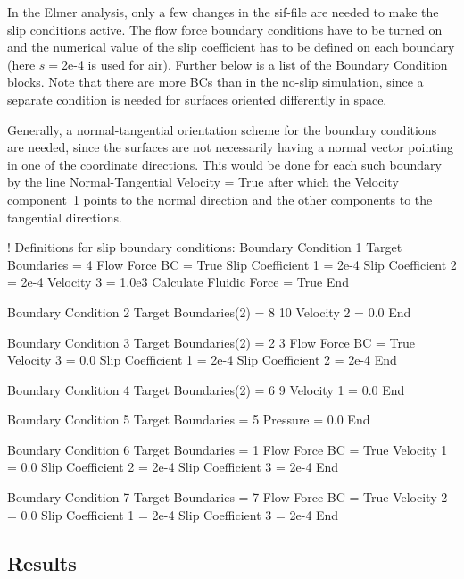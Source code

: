 In the Elmer analysis, only a few changes in the sif-file are needed
to make the slip conditions active. The flow force boundary conditions
have to be turned on and the numerical value of the slip coefficient
has to be defined on each boundary (here $s=$2e-4 is used for
air). Further below is a list of the Boundary Condition blocks. Note
that there are more BCs than in the no-slip simulation, since a
separate condition is needed for surfaces oriented differently in
space.

Generally, a normal-tangential orientation scheme for the boundary
conditions are needed, since the surfaces are not necessarily having a
normal vector pointing in one of the coordinate directions. This would
be done for each such boundary by the line
\ttbegin
  Normal-Tangential Velocity = True
\ttend
after which the Velocity component~1 points to the normal direction
and the other components to the tangential directions.

\ttbegin
! Definitions for slip boundary conditions:
Boundary Condition 1
  Target Boundaries = 4
   Flow Force BC = True
   Slip Coefficient 1 = 2e-4
   Slip Coefficient 2 = 2e-4
   Velocity 3 = 1.0e3
   Calculate Fluidic Force = True
End

Boundary Condition 2
  Target Boundaries(2) = 8 10
   Velocity 2 = 0.0
End

Boundary Condition 3
  Target Boundaries(2) = 2 3
   Flow Force BC = True
   Velocity 3 = 0.0
   Slip Coefficient 1 = 2e-4
   Slip Coefficient 2 = 2e-4
End

Boundary Condition 4
  Target Boundaries(2) = 6 9
   Velocity 1 = 0.0
End

Boundary Condition 5
  Target Boundaries = 5
  Pressure = 0.0
End

Boundary Condition 6
  Target Boundaries = 1
   Flow Force BC = True
   Velocity 1 = 0.0
   Slip Coefficient 2 = 2e-4
   Slip Coefficient 3 = 2e-4
End

Boundary Condition 7
  Target Boundaries = 7
   Flow Force BC = True
   Velocity 2 = 0.0
   Slip Coefficient 1 = 2e-4
   Slip Coefficient 3 = 2e-4
End
\ttend

\subsection*{Results}

